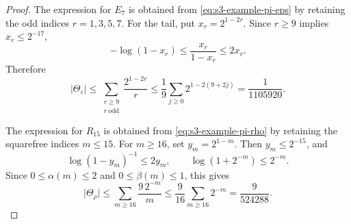\documentclass[11pt,a4paper]{amsart}
\theoremstyle{plain}
\theoremstyle{definition}
\theoremstyle{remark}
\newcommand{\abs}[1]{\lvert #1 \rvert}
\begin{document}
\begin{proof}
  The expression for \(E_7\) is obtained from
  \eqref{eq:s3-example-pi-eps} by retaining the odd indices
  \(r=1,3,5,7\). For the tail, put
  \(x_r=2^{1-2r}\). Since \(r\ge 9\) implies \(x_r\le 2^{-17}\),
  \[
    -\log(1-x_r)\le \frac{x_r}{1-x_r}\le 2x_r.
  \]
  Therefore
  \[
    \abs{\Theta_\varepsilon}
    \le
    \sum_{\substack{r\ge 9\\ r\ \mathrm{odd}}}\frac{2^{1-2r}}{r}
    \le
    \frac19\sum_{j\ge 0}2^{1-2(9+2j)}
    =
    \frac{1}{1105920}.
  \]

  The expression for \(R_{15}\) is obtained from
  \eqref{eq:s3-example-pi-rho} by retaining the squarefree indices
  \(m\le 15\). For \(m\ge 16\), set \(y_m=2^{1-m}\). Then
  \(y_m\le 2^{-15}\), and
  \[
    \log(1-y_m)^{-1}\le 2y_m,
    \qquad
    \log(1+2^{-m})\le 2^{-m}.
  \]
  Since \(0\le \alpha(m)\le 2\) and \(0\le \beta(m)\le 1\), this gives
  \[
    \abs{\Theta_\rho}
    \le
    \sum_{m\ge 16}\frac{9\,2^{-m}}{m}
    \le
    \frac{9}{16}\sum_{m\ge 16}2^{-m}
    =
    \frac{9}{524288}.
  \]


\end{proof}
\end{document}
